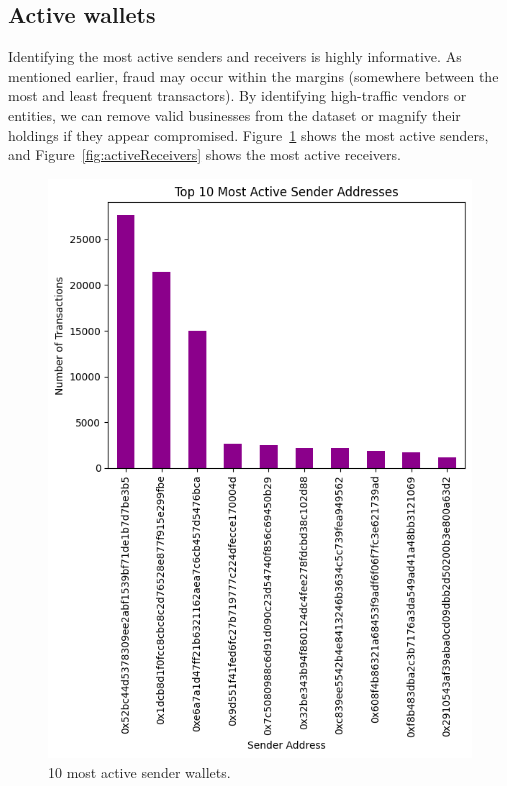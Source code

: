 \documentclass[sigconf]{acmart}
\begin{document}
\subsection{Active wallets}
Identifying the most active senders and receivers is highly informative. As mentioned earlier, fraud may occur within the margins (somewhere between the most and least frequent transactors). By identifying high-traffic vendors or entities, we can remove valid businesses from the dataset or magnify their holdings if they appear compromised. Figure~\ref{fig:activeSenders} shows the most active senders, and Figure~\ref{fig:activeReceivers} shows the most active receivers.

\begin{figure}[H]
    \centering
    \includegraphics[width=0.8\linewidth]{M4-active-sender.png}
    \caption{10 most active sender wallets.}
    \label{fig:activeSenders}
\end{figure}
\end{document}

